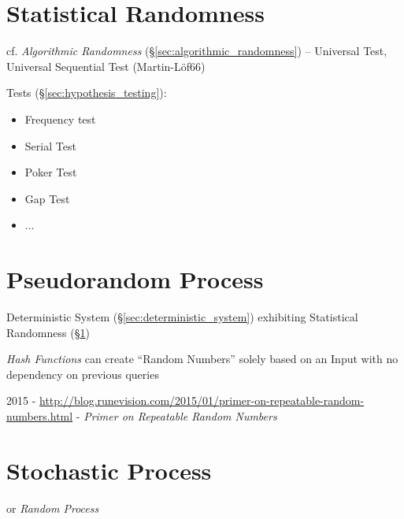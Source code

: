 \section{Statistical Randomness}\label{sec:statistical_randomness}

cf. \emph{Algorithmic Randomness} (\S\ref{sec:algorithmic_randomness}) --
Universal Test, Universal Sequential Test (Martin-L\"of66)

Tests (\S\ref{sec:hypothesis_testing}):
\begin{itemize}
  \item Frequency test
  \item Serial Test
  \item Poker Test
  \item Gap Test
  \item ...
\end{itemize}



\section{Pseudorandom Process}\label{sec:pseudorandom_process}

Deterministic System (\S\ref{sec:deterministic_system}) exhibiting Statistical
Randomness (\S\ref{sec:statistical_randomness})

\emph{Hash Functions} can create ``Random Numbers'' solely based on an Input
with no dependency on previous queries

2015 -
\url{http://blog.runevision.com/2015/01/primer-on-repeatable-random-numbers.html}
- \emph{Primer on Repeatable Random Numbers}



\section{Stochastic Process}\label{sec:stochastic_process}

or \emph{Random Process}


